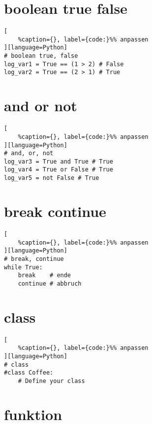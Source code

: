 \section{boolean true false}\label{boolean-true-false}

\lstset{language=Python}%
\begin{lstlisting}[
	%caption={}, label={code:}%% anpassen
][language=Python]
# boolean true, false
log_var1 = True == (1 > 2) # False
log_var2 = True == (2 > 1) # True
\end{lstlisting}

\section{and or not}\label{and-or-not}

\lstset{language=Python}%
\begin{lstlisting}[
	%caption={}, label={code:}%% anpassen
][language=Python]
# and, or, not
log_var3 = True and True # True
log_var4 = True or False # True
log_var5 = not False # True
\end{lstlisting}

\section{break continue}\label{break-continue}

\lstset{language=Python}%
\begin{lstlisting}[
	%caption={}, label={code:}%% anpassen
][language=Python]
# break, continue
while True:
    break    # ende
    continue # abbruch
\end{lstlisting}

\section{class}\label{class}

\lstset{language=Python}%
\begin{lstlisting}[
	%caption={}, label={code:}%% anpassen
][language=Python]
# class
#class Coffee:
    # Define your class
\end{lstlisting}

\section{funktion}\label{funktion}

